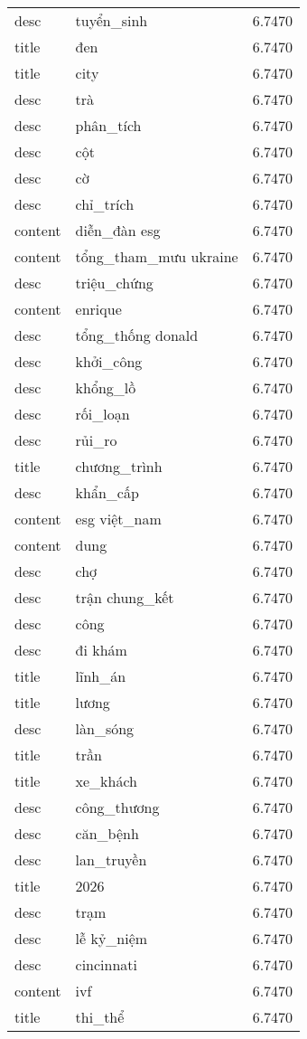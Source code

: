 \documentclass{article}
\begin{document}
\begin{tabular}{lll}
desc & tuyển\_sinh & 6.7470\\
title & đen & 6.7470\\
title & city & 6.7470\\
desc & trà & 6.7470\\
desc & phân\_tích & 6.7470\\
desc & cột & 6.7470\\
desc & cờ & 6.7470\\
desc & chỉ\_trích & 6.7470\\
content & diễn\_đàn esg & 6.7470\\
content & tổng\_tham\_mưu ukraine & 6.7470\\
desc & triệu\_chứng & 6.7470\\
content & enrique & 6.7470\\
desc & tổng\_thống donald & 6.7470\\
desc & khởi\_công & 6.7470\\
desc & khổng\_lồ & 6.7470\\
desc & rối\_loạn & 6.7470\\
desc & rủi\_ro & 6.7470\\
title & chương\_trình & 6.7470\\
desc & khẩn\_cấp & 6.7470\\
content & esg việt\_nam & 6.7470\\
content & dung & 6.7470\\
desc & chợ & 6.7470\\
desc & trận chung\_kết & 6.7470\\
desc & công & 6.7470\\
desc & đi khám & 6.7470\\
title & lĩnh\_án & 6.7470\\
title & lương & 6.7470\\
desc & làn\_sóng & 6.7470\\
title & trần & 6.7470\\
title & xe\_khách & 6.7470\\
desc & công\_thương & 6.7470\\
desc & căn\_bệnh & 6.7470\\
desc & lan\_truyền & 6.7470\\
title & 2026 & 6.7470\\
desc & trạm & 6.7470\\
desc & lễ kỷ\_niệm & 6.7470\\
desc & cincinnati & 6.7470\\
content & ivf & 6.7470\\
title & thi\_thể & 6.7470\\

\end{tabular}
\end{document}
